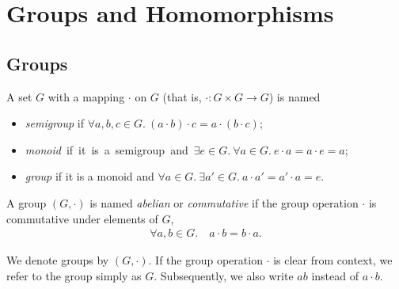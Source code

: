 
\chapter{Groups and Homomorphisms}
\section{Groups}
\begin{defn}\leavevmode
\begin{defnlist}
    \item A set $G$ with a mapping $\cdot$ on $G$ (that is, $\cdot: G \times G \to G$) is named \begin{itemize}
        \item \emph{semigroup} if $\forall a, b, c \in G.\ (a \cdot b) \cdot c = a \cdot (b \cdot c)$; 
        \item \mbox{\emph{monoid} if it is a semigroup and $\exists e \in G.\ \forall a \in G.\ e \cdot a = a \cdot e = a$; }
        \item \emph{group} if it is a monoid and $\forall a \in G.\ \exists a' \in G.\ a \cdot a' = a' \cdot a = e$. 
    \end{itemize}
    
    \item A group $(G,\cdot)$ is named \emph{abelian} or \emph{commutative} if the group operation $\cdot$ is commutative under elements of $G$, \begin{align}
        \forall a, b \in G.\quad a \cdot b = b \cdot a.
    \end{align}
    
    \begin{marginfigure}
        We denote groups by $(G,\cdot)$. If the group operation $\cdot$ is clear from context, we refer to the group simply as $G$. Subsequently, we also write $a b$ instead of $a \cdot b$.
    \end{marginfigure}
\end{defnlist}
\end{defn}

